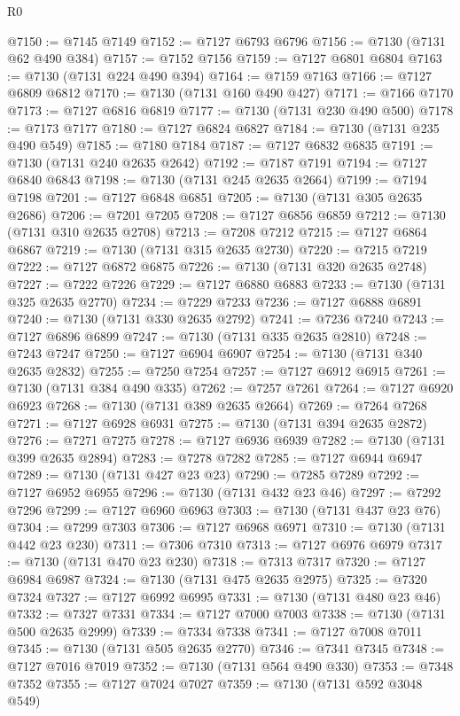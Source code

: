 \begin{lexlean}{R0}
\begin{coremodule}
@7150 := @7145 @7149
@7152 := @7127 @6793 @6796
@7156 := @7130 (@7131 @62 @490 @384)
@7157 := @7152 @7156
@7159 := @7127 @6801 @6804
@7163 := @7130 (@7131 @224 @490 @394)
@7164 := @7159 @7163
@7166 := @7127 @6809 @6812
@7170 := @7130 (@7131 @160 @490 @427)
@7171 := @7166 @7170
@7173 := @7127 @6816 @6819
@7177 := @7130 (@7131 @230 @490 @500)
@7178 := @7173 @7177
@7180 := @7127 @6824 @6827
@7184 := @7130 (@7131 @235 @490 @549)
@7185 := @7180 @7184
@7187 := @7127 @6832 @6835
@7191 := @7130 (@7131 @240 @2635 @2642)
@7192 := @7187 @7191
@7194 := @7127 @6840 @6843
@7198 := @7130 (@7131 @245 @2635 @2664)
@7199 := @7194 @7198
@7201 := @7127 @6848 @6851
@7205 := @7130 (@7131 @305 @2635 @2686)
@7206 := @7201 @7205
@7208 := @7127 @6856 @6859
@7212 := @7130 (@7131 @310 @2635 @2708)
@7213 := @7208 @7212
@7215 := @7127 @6864 @6867
@7219 := @7130 (@7131 @315 @2635 @2730)
@7220 := @7215 @7219
@7222 := @7127 @6872 @6875
@7226 := @7130 (@7131 @320 @2635 @2748)
@7227 := @7222 @7226
@7229 := @7127 @6880 @6883
@7233 := @7130 (@7131 @325 @2635 @2770)
@7234 := @7229 @7233
@7236 := @7127 @6888 @6891
@7240 := @7130 (@7131 @330 @2635 @2792)
@7241 := @7236 @7240
@7243 := @7127 @6896 @6899
@7247 := @7130 (@7131 @335 @2635 @2810)
@7248 := @7243 @7247
@7250 := @7127 @6904 @6907
@7254 := @7130 (@7131 @340 @2635 @2832)
@7255 := @7250 @7254
@7257 := @7127 @6912 @6915
@7261 := @7130 (@7131 @384 @490 @335)
@7262 := @7257 @7261
@7264 := @7127 @6920 @6923
@7268 := @7130 (@7131 @389 @2635 @2664)
@7269 := @7264 @7268
@7271 := @7127 @6928 @6931
@7275 := @7130 (@7131 @394 @2635 @2872)
@7276 := @7271 @7275
@7278 := @7127 @6936 @6939
@7282 := @7130 (@7131 @399 @2635 @2894)
@7283 := @7278 @7282
@7285 := @7127 @6944 @6947
@7289 := @7130 (@7131 @427 @23 @23)
@7290 := @7285 @7289
@7292 := @7127 @6952 @6955
@7296 := @7130 (@7131 @432 @23 @46)
@7297 := @7292 @7296
@7299 := @7127 @6960 @6963
@7303 := @7130 (@7131 @437 @23 @76)
@7304 := @7299 @7303
@7306 := @7127 @6968 @6971
@7310 := @7130 (@7131 @442 @23 @230)
@7311 := @7306 @7310
@7313 := @7127 @6976 @6979
@7317 := @7130 (@7131 @470 @23 @230)
@7318 := @7313 @7317
@7320 := @7127 @6984 @6987
@7324 := @7130 (@7131 @475 @2635 @2975)
@7325 := @7320 @7324
@7327 := @7127 @6992 @6995
@7331 := @7130 (@7131 @480 @23 @46)
@7332 := @7327 @7331
@7334 := @7127 @7000 @7003
@7338 := @7130 (@7131 @500 @2635 @2999)
@7339 := @7334 @7338
@7341 := @7127 @7008 @7011
@7345 := @7130 (@7131 @505 @2635 @2770)
@7346 := @7341 @7345
@7348 := @7127 @7016 @7019
@7352 := @7130 (@7131 @564 @490 @330)
@7353 := @7348 @7352
@7355 := @7127 @7024 @7027
@7359 := @7130 (@7131 @592 @3048 @549)

\end{coremodule}
\end{lexlean}
